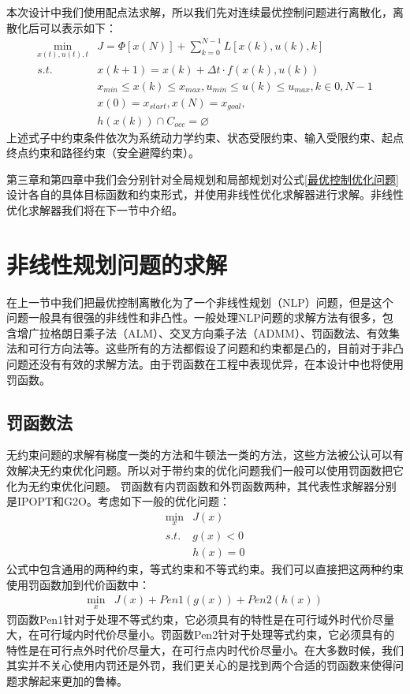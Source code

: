\documentclass[master,academic]{ysuthesis} %
\begin{document}
	本次设计中我们使用配点法求解，所以我们先对连续最优控制问题进行离散化，离散化后可以表示如下：
	\begin{equation}
	\begin{aligned}
		\min_{x(t),u(t),t} &J = \Phi[x(N)]+\sum_{k=0}^{N-1}L[x(k),u(k),k]\\
			s.t. \ \ \ &x(k+1) = x(k)+ \Delta t \cdot f(x(k),u(k))\\
			&x_{min}\le x(k) \le x_{max},u_{min}\le u(k) \le u_{max},k \in{0,N-1}\\
			&x(0)=x_{start},x(N)=x_{goal},\\
			&h(x(k))\cap C_{occ}=\varnothing 
	\end{aligned}
	\label{最优控制优化问题}
	\end{equation}
	上述式子中约束条件依次为系统动力学约束、状态受限约束、输入受限约束、起点终点约束和路径约束（安全避障约束）。

	第三章和第四章中我们会分别针对全局规划和局部规划对公式\ref{最优控制优化问题}设计各自的具体目标函数和约束形式，并使用非线性优化求解器进行求解。非线性优化求解器我们将在下一节中介绍。

	\section{非线性规划问题的求解}
	在上一节中我们把最优控制离散化为了一个非线性规划（NLP）问题，但是这个问题一般具有很强的非线性和非凸性。一般处理NLP问题的求解方法有很多，包含增广拉格朗日乘子法（ALM）、交叉方向乘子法（ADMM）、罚函数法、有效集法和可行方向法等。这些所有的方法都假设了问题和约束都是凸的，目前对于非凸问题还没有有效的求解方法。由于罚函数在工程中表现优异，在本设计中也将使用罚函数。
		\subsection{罚函数法}
		无约束问题的求解有梯度一类的方法和牛顿法一类的方法，这些方法被公认可以有效解决无约束优化问题。所以对于带约束的优化问题我们一般可以使用罚函数把它化为无约束优化问题。
		罚函数有内罚函数和外罚函数两种，其代表性求解器分别是IPOPT和G2O。考虑如下一般的优化问题：
		\begin{equation}
			\begin{aligned}
				\min_{x} &J(x)\\
					s.t. &g(x)<0\\
					&h(x)=0
			\end{aligned}
			\label{优化问题}
		\end{equation}
		公式\cite{优化问题}中包含通用的两种约束，等式约束和不等式约束。我们可以直接把这两种约束使用罚函数加到代价函数中：
		\begin{equation}
			\begin{aligned}
				\min_{x} &J(x)+Pen1(g(x))+Pen2(h(x))
			\end{aligned}
		\end{equation}
		罚函数Pen1针对于处理不等式约束，它必须具有的特性是在可行域外时代价尽量大，在可行域内时代价尽量小。罚函数Pen2针对于处理等式约束，它必须具有的特性是在可行点外时代价尽量大，在可行点内时代价尽量小。在大多数时候，我们其实并不关心使用内罚还是外罚，我们更关心的是找到两个合适的罚函数来使得问题求解起来更加的鲁棒。
\end{document}
